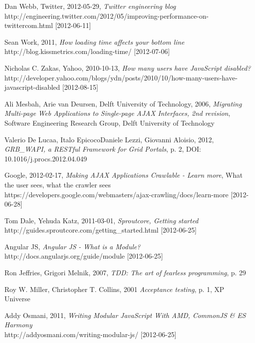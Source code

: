 \begin{thebibliography}{9}

 Dan Webb, Twitter, 2012-05-29, {\em Twitter engineering blog}\\http://engineering.twitter.com/2012/05/improving-performance-on-twittercom.html [2012-06-11]

 Sean Work, 2011, {\em How loading time affects your bottom line}\\http://blog.kissmetrics.com/loading-time/ [2012-07-06]

 Nicholas C. Zakas, Yahoo, 2010-10-13, {\em How many users have JavaScript disabled?}\\http://developer.yahoo.com/blogs/ydn/posts/2010/10/how-many-users-have-javascript-disabled [2012-08-15]

 Ali Mesbah, Arie van Deursen, Delft University of Technology, 2006, {\em Migrating Multi-page Web Applications to Single-page AJAX Interfaces, 2nd revision}, Software Engineering Research Group, Delft University of Technology%

 Valerio De Lucaa, Italo EpicocoDaniele Lezzi, Giovanni Aloisio, 2012, {\em GRB\_WAPI, a RESTful Framework for Grid Portals}, p. 2, DOI: 10.1016/j.procs.2012.04.049

 Google, 2012-02-17, {\em Making AJAX Applications Crawlable - Learn more}, What the user sees, what the crawler sees\\https://developers.google.com/webmasters/ajax-crawling/docs/learn-more [2012-06-28]

 Tom Dale, Yehuda Katz, 2011-03-01, {\em Sproutcore, Getting started}\\http://guides.sproutcore.com/getting\_started.html [2012-06-25]

 Angular JS, {\em Angular JS - What is a Module?}\\http://docs.angularjs.org/guide/module [2012-06-25]

 Ron Jeffries, Grigori Melnik, 2007, {\em TDD: The art of fearless programming}, p. 29

 Roy W. Miller, Christopher T. Collins, 2001 {\em Acceptance testing}, p. 1, XP Universe 

 Addy Osmani, 2011, {\em Writing Modular JavaScript With AMD, CommonJS \& ES Harmony}\\http://addyosmani.com/writing-modular-js/ [2012-06-25]


\end{thebibliography}
